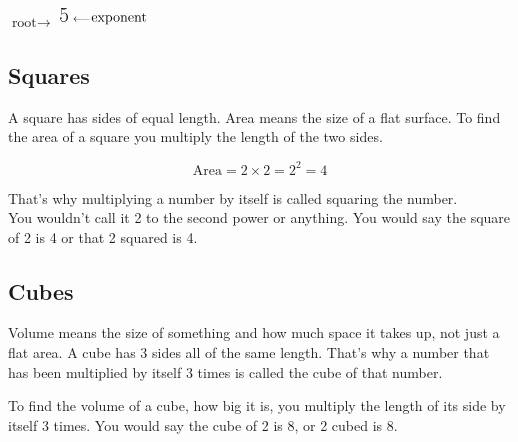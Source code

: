 \documentclass{article}
\begin{document}
\begin{spacing}{1.25}
\begin{center}
$\text{root}\rightarrow$
{\fontsize{30}{34}}
$\textsuperscript{{\fontsize{15}{20}\selectfont 5} $\longleftarrow$}\textsuperscript{\normalsize{\text{exponent}}}$
\normalsize
\end{center}

\pagebreak

\subsection*{Squares}

A square has sides of equal length. Area means the size of a flat surface. To find the area of a square you multiply the length of the two sides.\\

\begin{figure}
  \centering
  \quad
  \begin{minipage}{5cm}
    \[
    \text{Area} = 2 \times 2 = 2^2 = 4
    \]
  \end{minipage}
\end{figure}

That's why multiplying a number by itself is called squaring the number.\\

 You wouldn't call it 2 to the second power or anything. You would say the square of 2 is 4 or that 2 squared is 4.

\pagebreak

\subsection*{Cubes}

Volume means the size of something and how much space it takes up, not just a flat area.
A cube has 3 sides all of the same length.
That's why a number that has been multiplied by itself 3 times is called the cube of that number.

To find the volume of a cube, how big it is, you multiply the length of its side by itself 3 times. You would say the cube of 2 is 8, or 2 cubed is 8.


\end{spacing}
\end{document}
